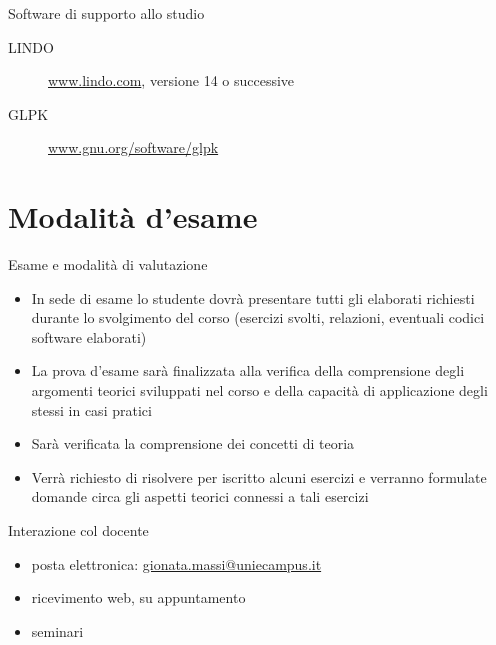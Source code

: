 \documentclass{beamer}
\begin{document}
\begin{frame}{Software di supporto allo studio}
    \begin{description}
     \item[LINDO] \href{http://www.lindo.com/}{www.lindo.com}, versione 14 o successive
     \item[GLPK] \href{http://www.gnu.org/software/glpk/}{www.gnu.org/software/glpk}
    \end{description}
\end{frame}

\section{Modalit\`a d'esame}

\begin{frame}{Esame e modalit\`a di valutazione}
    \begin{itemize}
     \item  In sede di esame lo studente dovr\`a presentare tutti gli elaborati richiesti durante
     lo svolgimento del corso (esercizi svolti, relazioni, eventuali codici software elaborati)
     \item  La prova d'esame sar\`a finalizzata alla verifica della comprensione degli argomenti
     teorici sviluppati nel corso e della capacit\`a di applicazione degli stessi in casi pratici
     \item  Sar\`a verificata la comprensione dei concetti di teoria
     \item  Verr\`a richiesto di risolvere per iscritto alcuni esercizi e verranno formulate domande
     circa gli aspetti teorici connessi a tali esercizi
    \end{itemize}
\end{frame}

\begin{frame}{Interazione col docente}
  \begin{itemize}
    \item posta elettronica: \textcolor{blue}{\href{mailto:gionata.massi@uniecampus.it}{gionata.massi@uniecampus.it}}
    \item ricevimento web, su appuntamento
    \item seminari
  \end{itemize}
\end{frame}
\end{document}
